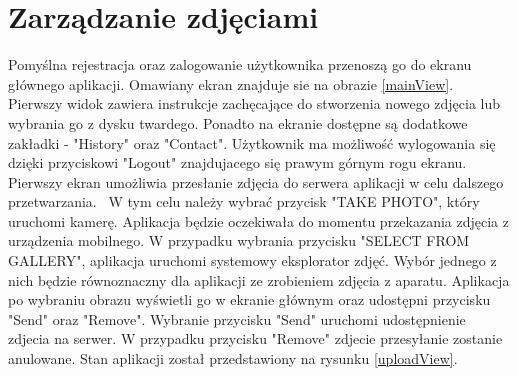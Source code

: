 \section{Zarządzanie zdjęciami}{

Pomyślna rejestracja oraz zalogowanie użytkownika przenoszą go do ekranu głównego aplikacji. Omawiany ekran znajduje sie na obrazie \ref{mainView}. Pierwszy widok zawiera instrukcje zachęcające do stworzenia nowego zdjęcia lub wybrania go z dysku twardego. Ponadto na ekranie dostępne są dodatkowe zakładki - "History" oraz "Contact". Użytkownik ma możliwość wylogowania się dzięki przyciskowi "Logout" znajdujacego się prawym górnym rogu ekranu. Pierwszy ekran umożliwia przesłanie zdjęcia do serwera aplikacji w celu dalszego przetwarzania. ~W tym celu należy wybrać przycisk "TAKE PHOTO", który uruchomi kamerę. Aplikacja będzie oczekiwała do momentu przekazania zdjęcia z urządzenia mobilnego. W przypadku wybrania przycisku "SELECT FROM GALLERY", aplikacja uruchomi systemowy eksplorator zdjęć. Wybór jednego z nich będzie równoznaczny dla aplikacji ze zrobieniem zdjęcia z aparatu. Aplikacja po wybraniu obrazu wyświetli go w ekranie głównym oraz udostępni przycisku "Send" oraz "Remove". Wybranie przycisku "Send" uruchomi udostępnienie zdjecia na serwer. W przypadku przycisku "Remove" zdjecie przesyłanie zostanie anulowane. Stan aplikacji został przedstawiony na rysunku \ref{uploadView}.

\begin{figure}[htb]
	

\end{figure}}
